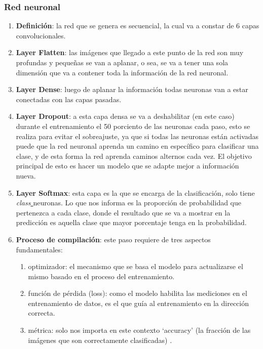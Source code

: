 \documentclass{book}
\begin{document}
				\subsubsection{Red neuronal}
					\begin{enumerate}
						\item \textbf{Definici\'on}: la red que se genera es secuencial, la cual va a constar de 6 capas convolucionales.
						\item \textbf{Layer Flatten}: las im\'agenes que llegado a este punto de la red son muy profundas y peque\~nas se van a aplanar, o sea, se va a tener una sola dimensi\'on que va a contener toda la informaci\'on de la red neuronal.
						\item \textbf{Layer Dense}: luego de aplanar la informaci\'on todas neuronas van a estar conectadas con las capas pasadas.
						\item \textbf{Layer Dropout}: a esta capa densa se va a deshabilitar (en este caso) durante el entrenamiento el 50 porciento de las neuronas cada paso, esto se realiza para evitar el sobreajuste, ya que si todas las neuronas est\'an activadas puede que la red neuronal aprenda un camino en espec\'ifico para clasificar una clase, y de esta forma la red aprenda caminos alternos cada vez. El objetivo principal de esto es hacer un modelo que se adapte mejor a informaci\'on nueva.
						\item \textbf{Layer Softmax}: esta capa es la que se encarga de la clasificaci\'on, solo tiene \textit{class\underline{ }} neuronas. Lo que nos informa es la proporci\'on de probabilidad que pertenezca a cada clase, donde el resultado que se va a mostrar en la predicci\'on es aquella clase que mayor porcentaje tenga en la probabilidad.  
						\item \textbf{Proceso de compilaci\'on}: este paso requiere de tres aspectos fundamentales:
						\begin{enumerate}
							\item optimizador: el mecanismo que se basa el modelo para actualizarse el mismo basado en el proceso del entrenamiento.	
							\item funci\'on de p\'erdida (loss):  como el modelo habilita las mediciones en el entrenamiento de datos, es el que gu\'ia al entrenamiento en la direcci\'on correcta.
							\item m\'etrica: solo nos importa en este contexto ‘accuracy’ (la fracci\'on de las im\'agenes que son correctamente clasificadas)
							.
						\end{enumerate}

\end{enumerate}
\end{document}
